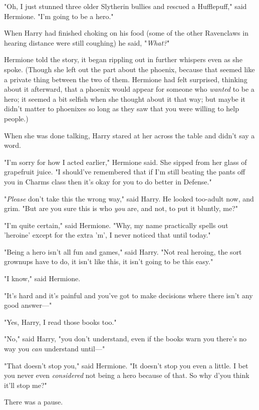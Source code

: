 "Oh, I just stunned three older Slytherin bullies and rescued a Hufflepuff," 
said Hermione. "I'm going to be a hero."

When Harry had finished choking on his food (some of the other Ravenclaws in 
hearing distance were still coughing) he said, "\emph{What?}"

Hermione told the story, it began rippling out in further whispers even as she 
spoke. (Though she left out the part about the phoenix, because that seemed 
like a private thing between the two of them. Hermione had felt surprised, 
thinking about it afterward, that a phoenix would appear for someone who 
\emph{wanted} to be a hero; it seemed a bit selfish when she thought about it 
that way; but maybe it didn't matter to phoenixes so long as they saw that you 
were willing to help people.)

When she was done talking, Harry stared at her across the table and didn't say 
a word.

"I'm sorry for how I acted earlier," Hermione said. She sipped from her glass 
of grapefruit juice. "I should've remembered that if I'm still beating the 
pants off you in Charms class then it's okay for you to do better in Defense."

"\emph{Please} don't take this the wrong way," said Harry. He looked too-adult 
now, and grim. "But are you sure this is who \emph{you} are, and not, to put it 
bluntly, me?"

"I'm quite certain," said Hermione. "Why, my name practically spells out 
'heroine' except for the extra 'm', I never noticed that until today."

"Being a hero isn't all fun and games," said Harry. "Not real heroing, the sort 
grownups have to do, it isn't like this, it isn't going to be this easy."

"I know," said Hermione.

"It's hard and it's painful and you've got to make decisions where there isn't 
any good answer---"

"Yes, Harry, I read those books too."

"No," said Harry, "you don't understand, even if the books warn you there's no 
way you \emph{can} understand until---"

"That doesn't stop you," said Hermione. "It doesn't stop you even a little. I 
bet you never even \emph{considered} not being a hero because of that. So why 
d'you think it'll stop me?"

There was a pause.

